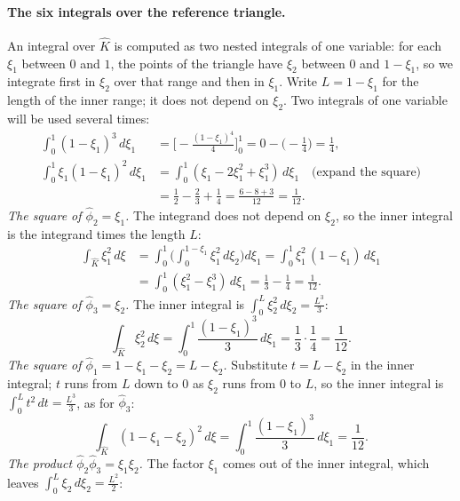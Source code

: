 \paragraph{The six integrals over the reference triangle.} An integral over $\hat K$ is computed as two nested integrals of one variable: for each $\xi_1$ between $0$ and $1$, the points of the triangle have $\xi_2$ between $0$ and $1 - \xi_1$, so we integrate first in $\xi_2$ over that range and then in $\xi_1$. Write $L = 1 - \xi_1$ for the length of the inner range; it does not depend on $\xi_2$. Two integrals of one variable will be used several times:
\begin{align*}
\int_0^1 (1 - \xi_1)^3\, d\xi_1 &= \Big[-\frac{(1 - \xi_1)^4}{4}\Big]_0^1 = 0 - \Big(-\frac14\Big) = \frac14, \\
\int_0^1 \xi_1(1 - \xi_1)^2\, d\xi_1 &= \int_0^1 (\xi_1 - 2\xi_1^2 + \xi_1^3)\, d\xi_1 \quad \text{(expand the square)}\\
&= \frac12 - \frac23 + \frac14 = \frac{6 - 8 + 3}{12} = \frac{1}{12} .
\end{align*}
\emph{The square of $\hat\phi_2 = \xi_1$.} The integrand does not depend on $\xi_2$, so the inner integral is the integrand times the length $L$:
\begin{align*}
\int_{\hat K} \xi_1^2\, d\xi &= \int_0^1 \Big(\int_0^{1-\xi_1} \xi_1^2\, d\xi_2\Big) d\xi_1 = \int_0^1 \xi_1^2\,(1 - \xi_1)\, d\xi_1 \\
&= \int_0^1 (\xi_1^2 - \xi_1^3)\, d\xi_1 = \frac13 - \frac14 = \frac{1}{12} .
\end{align*}
\emph{The square of $\hat\phi_3 = \xi_2$.} The inner integral is $\int_0^L \xi_2^2\, d\xi_2 = \frac{L^3}{3}$:
\begin{equation*}
\int_{\hat K} \xi_2^2\, d\xi = \int_0^1 \frac{(1 - \xi_1)^3}{3}\, d\xi_1 = \frac13\cdot\frac14 = \frac{1}{12} .
\end{equation*}
\emph{The square of $\hat\phi_1 = 1 - \xi_1 - \xi_2 = L - \xi_2$.} Substitute $t = L - \xi_2$ in the inner integral; $t$ runs from $L$ down to $0$ as $\xi_2$ runs from $0$ to $L$, so the inner integral is $\int_0^L t^2\, dt = \frac{L^3}{3}$, as for $\hat\phi_3$:
\begin{equation*}
\int_{\hat K} (1 - \xi_1 - \xi_2)^2\, d\xi = \int_0^1 \frac{(1 - \xi_1)^3}{3}\, d\xi_1 = \frac{1}{12} .
\end{equation*}
\emph{The product $\hat\phi_2\hat\phi_3 = \xi_1\xi_2$.} The factor $\xi_1$ comes out of the inner integral, which leaves $\int_0^L \xi_2\, d\xi_2 = \frac{L^2}{2}$:

